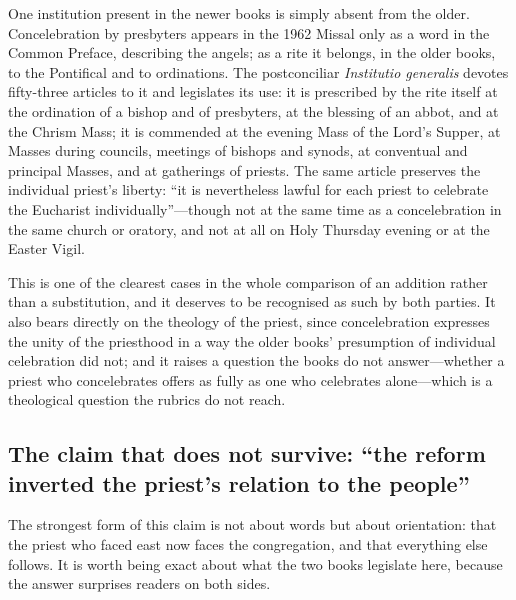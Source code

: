 One institution present in the newer books is simply absent from the older. Concelebration by presbyters appears in the 1962 Missal only as a word in the Common Preface, describing the angels; as a rite it belongs, in the older books, to the Pontifical and to ordinations. The postconciliar \emph{Institutio generalis} devotes fifty-three articles to it and legislates its use: it is prescribed by the rite itself at the ordination of a bishop and of presbyters, at the blessing of an abbot, and at the Chrism Mass; it is commended at the evening Mass of the Lord's Supper, at Masses during councils, meetings of bishops and synods, at conventual and principal Masses, and at gatherings of priests. The same article preserves the individual priest's liberty: ``it is nevertheless lawful for each priest to celebrate the Eucharist individually''---though not at the same time as a concelebration in the same church or oratory, and not at all on Holy Thursday evening or at the Easter Vigil.

This is one of the clearest cases in the whole comparison of an addition rather than a substitution, and it deserves to be recognised as such by both parties. It also bears directly on the theology of the priest, since concelebration expresses the unity of the priesthood in a way the older books' presumption of individual celebration did not; and it raises a question the books do not answer---whether a priest who concelebrates offers as fully as one who celebrates alone---which is a theological question the rubrics do not reach.

\subsection{The claim that does not survive: ``the reform inverted the priest's relation to the people''}

The strongest form of this claim is not about words but about orientation: that the priest who faced east now faces the congregation, and that everything else follows. It is worth being exact about what the two books legislate here, because the answer surprises readers on both sides.


